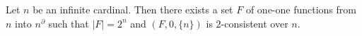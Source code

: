 Let $n$ be an infinite cardinal. Then there exists a set $F$ of one-one functions from $n$ into $n^{\partial}$ such that $|F| = 2^n$ and $(F, 0, \{n\})$ is $2$-consistent over $n$.
